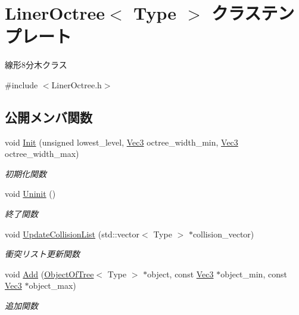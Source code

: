 \hypertarget{class_liner_octree}{}\section{Liner\+Octree$<$ Type $>$ クラステンプレート}
\label{class_liner_octree}


線形8分木クラス  




{\ttfamily \#include $<$Liner\+Octree.\+h$>$}

\subsection*{公開メンバ関数}
\begin{DoxyCompactItemize}
\item 
void \mbox{\hyperlink{class_liner_octree_a715d655c722c00c002d0bb006d0600d8}{Init}} (unsigned lowest\+\_\+level, \mbox{\hyperlink{_vector3_d_8h_ab16f59e4393f29a01ec8b9bbbabbe65d}{Vec3}} octree\+\_\+width\+\_\+min, \mbox{\hyperlink{_vector3_d_8h_ab16f59e4393f29a01ec8b9bbbabbe65d}{Vec3}} octree\+\_\+width\+\_\+max)
\begin{DoxyCompactList}\small\item\em 初期化関数 \end{DoxyCompactList}\item 
void \mbox{\hyperlink{class_liner_octree_a86b5b9bc86630644e84508ff385cda69}{Uninit}} ()
\begin{DoxyCompactList}\small\item\em 終了関数 \end{DoxyCompactList}\item 
void \mbox{\hyperlink{class_liner_octree_a880276cc9099c29f447f3ca0043b9ce9}{Update\+Collision\+List}} (std\+::vector$<$ Type $>$ $\ast$collision\+\_\+vector)
\begin{DoxyCompactList}\small\item\em 衝突リスト更新関数 \end{DoxyCompactList}\item 
void \mbox{\hyperlink{class_liner_octree_ac5773a5193942a68f77a33baed9d69d4}{Add}} (\mbox{\hyperlink{class_object_of_tree}{Object\+Of\+Tree}}$<$ Type $>$ $\ast$object, const \mbox{\hyperlink{_vector3_d_8h_ab16f59e4393f29a01ec8b9bbbabbe65d}{Vec3}} $\ast$object\+\_\+min, const \mbox{\hyperlink{_vector3_d_8h_ab16f59e4393f29a01ec8b9bbbabbe65d}{Vec3}} $\ast$object\+\_\+max)
\begin{DoxyCompactList}\small\item\em 追加関数 \end{DoxyCompactList}\end{DoxyCompactItemize}
